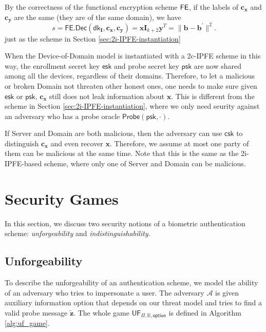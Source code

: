By the correctness of the functional encryption scheme $\sf FE$, if the labels of $\mathbf{c_x}$ and $\mathbf{c_y}$ are the same (they are of the same domain), we have
\[
	s = \textsf{FE.Dec}(\textsf{dk}_{\mathbf{I}}, \mathbf{c_x}, \mathbf{c_y}) =  \mathbf{x} \mathbf{I}_{k+2} \mathbf{y}^T = \| \mathbf{b} - \mathbf{b}^\prime \|^2.
\]
just as the scheme in Section \ref{sec:2i-IPFE-instantiation}

When the Device-of-Domain model is instantiated with a 2c-IPFE scheme in this way, the enrollment secret key $\textsf{esk}$ and probe secret key $\textsf{psk}$ are now shared among all the devices, regardless of their domains. Therefore, to let a malicious or broken \textsf{Domain} not threaten other honest ones, one needs to make sure given $\textsf{esk}$ or $\textsf{psk}$, $\mathbf{c_x}$ still does not leak information about $\mathbf{x}$. This is different from the scheme in Section \ref{sec:2i-IPFE-instantiation}, where we only need seurity against an adversary who has a probe oracle $\textsf{Probe}(\textsf{psk}, \cdot)$.

If \textsf{Server} and \textsf{Domain} are both malicious, then the adversary can use $\textsf{csk}$ to distinguish $\mathbf{c_x}$ and even recover $\mathbf{x}$. Therefore, we assume at most one party of them can be malicious at the same time. Note that this is the same as the 2i-IPFE-based scheme, where only one of \textsf{Server} and \textsf{Domain} can be malicious.

\fi



\section{Security Games}
\label{sec:security_game}

In this section, we discuss two security notions of a biometric authentication scheme: \emph{unforgeability} and \emph{indistinguishability}.

\subsection{Unforgeability}
\label{sec:uf_game}

To describe the unforgeability of an authentication scheme, we model the ability of an adversary who tries to impersonate a user. The adversary $\mathcal{A}$ is given auxiliary information \textsf{option} that depends on our threat model and tries to find a valid probe message $\mathbf{\tilde{z}}$. The whole game $\textsf{UF}_{\Pi, \mathbb{B}, \textsf{option}}$ is defined in Algorithm \ref{alg:uf_game}.

